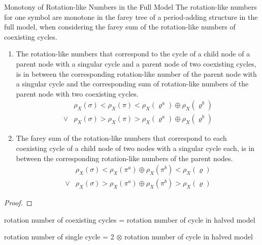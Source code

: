\begin{theorem}{Monotony of Rotation-like Numbers in the Full Model}
	The rotation-like numbers for one symbol are monotone in the farey tree of a period-adding structure in the full model, when considering the farey sum of the rotation-like numbers of coexisting cycles.
	\begin{enumerate}
		\item The rotation-like numbers that correspond to the cycle of a child node of a parent node with a singular cycle and a parent node of two coexisting cycles, is in between the corresponding rotation-like number of the parent node with a singular cycle and the corresponding sum of rotation-like numbers of the parent node with two coexisting cycles.
		      \begin{align*}
			           & \rho_X(\sigma) < \rho_X(\pi) < \rho_X(\varrho^a) \oplus \rho_X(\varrho^b) \\
			      \lor & \rho_X(\sigma) > \rho_X(\pi) > \rho_X(\varrho^a) \oplus \rho_X(\varrho^b)
		      \end{align*}
		\item The farey sum of the rotation-like numbers that correspond to each coexisting cycle of a child node of two nodes with a singular cycle each, is in between the corresponding rotation-like numbers of the parent nodes.
		      \begin{align*}
			           & \rho_X(\sigma) < \rho_X(\pi^a) \oplus \rho_X(\pi^b) < \rho_X(\varrho) \\
			      \lor & \rho_X(\sigma) > \rho_X(\pi^a) \oplus \rho_X(\pi^b) > \rho_X(\varrho)
		      \end{align*}
	\end{enumerate}
\end{theorem}

\begin{proof}
\end{proof}


rotation number of coexisting cycles = rotation number of cycle in halved model

rotation number of single cycle = 2 $\otimes$ rotation number of cycle in halved model
